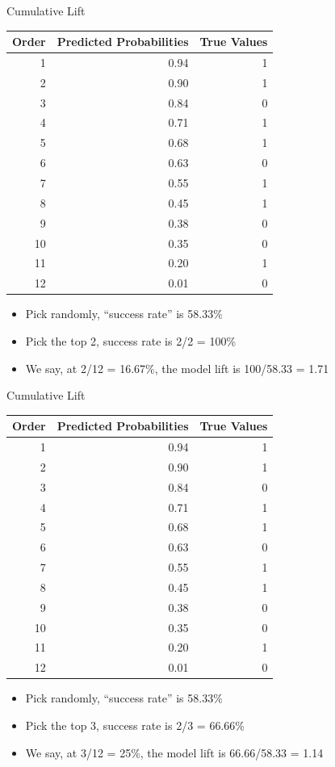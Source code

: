 \documentclass[
  ignorenonframetext,
]{beamer}
\providecommand{\tightlist}{%
  \setlength{\itemsep}{0pt}\setlength{\parskip}{0pt}}
\begin{document}
\begin{frame}{Cumulative Lift}
\protect\hypertarget{cumulative-lift-4}{}
\begin{longtable}[]{@{}rrr@{}}
\toprule
Order & Predicted Probabilities & True Values \\
\midrule
\endhead
1 & 0.94 & 1 \\
2 & 0.90 & 1 \\
3 & 0.84 & 0 \\
4 & 0.71 & 1 \\
5 & 0.68 & 1 \\
6 & 0.63 & 0 \\
7 & 0.55 & 1 \\
8 & 0.45 & 1 \\
9 & 0.38 & 0 \\
10 & 0.35 & 0 \\
11 & 0.20 & 1 \\
12 & 0.01 & 0 \\
\bottomrule
\end{longtable}

\begin{itemize}
\tightlist
\item
  Pick randomly, ``success rate'' is 58.33\%
\item
  Pick the top 2, success rate is 2/2 = 100\%
\item
  We say, at 2/12 = 16.67\%, the model lift is 100/58.33 = 1.71
\end{itemize}
\end{frame}

\begin{frame}{Cumulative Lift}
\protect\hypertarget{cumulative-lift-5}{}
\begin{longtable}[]{@{}rrr@{}}
\toprule
Order & Predicted Probabilities & True Values \\
\midrule
\endhead
1 & 0.94 & 1 \\
2 & 0.90 & 1 \\
3 & 0.84 & 0 \\
4 & 0.71 & 1 \\
5 & 0.68 & 1 \\
6 & 0.63 & 0 \\
7 & 0.55 & 1 \\
8 & 0.45 & 1 \\
9 & 0.38 & 0 \\
10 & 0.35 & 0 \\
11 & 0.20 & 1 \\
12 & 0.01 & 0 \\
\bottomrule
\end{longtable}

\begin{itemize}
\tightlist
\item
  Pick randomly, ``success rate'' is 58.33\%
\item
  Pick the top 3, success rate is 2/3 = 66.66\%
\item
  We say, at 3/12 = 25\%, the model lift is 66.66/58.33 = 1.14
\end{itemize}
\end{frame}
\end{document}
